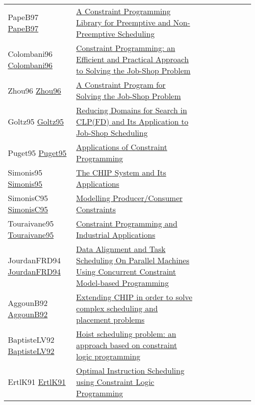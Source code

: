 {\begin{longtable}{p{3cm}p{7cm}lllllll}
PapeB97 \href{}{PapeB97} &  \href{}{A Constraint Programming Library for Preemptive and Non-Preemptive Scheduling} &  &  &  &  &  &  & \\
Colombani96 \href{https://doi.org/10.1007/3-540-61551-2\_72}{Colombani96} &  \href{papers/Colombani96.pdf}{Constraint Programming: an Efficient and Practical Approach to Solving the Job-Shop Problem} &  &  &  &  &  &  & \\
Zhou96 \href{https://doi.org/10.1007/3-540-61551-2\_97}{Zhou96} &  \href{papers/Zhou96.pdf}{A Constraint Program for Solving the Job-Shop Problem} &  &  &  &  &  &  & \\
Goltz95 \href{https://doi.org/10.1007/3-540-60299-2\_33}{Goltz95} &  \href{papers/Goltz95.pdf}{Reducing Domains for Search in {CLP(FD)} and Its Application to Job-Shop Scheduling} &  &  &  &  &  &  & \\
Puget95 \href{https://doi.org/10.1007/3-540-60299-2\_43}{Puget95} &  \href{papers/Puget95.pdf}{Applications of Constraint Programming} &  &  &  &  &  &  & \\
Simonis95 \href{https://doi.org/10.1007/3-540-60299-2\_42}{Simonis95} &  \href{papers/Simonis95.pdf}{The {CHIP} System and Its Applications} &  &  &  &  &  &  & \\
SimonisC95 \href{https://doi.org/10.1007/3-540-60299-2\_27}{SimonisC95} &  \href{papers/SimonisC95.pdf}{Modelling Producer/Consumer Constraints} &  &  &  &  &  &  & \\
Touraivane95 \href{https://doi.org/10.1007/3-540-60299-2\_41}{Touraivane95} &  \href{papers/Touraivane95.pdf}{Constraint Programming and Industrial Applications} &  &  &  &  &  &  & \\
JourdanFRD94 \href{}{JourdanFRD94} &  \href{}{Data Alignment and Task Scheduling On Parallel Machines Using Concurrent Constraint Model-based Programming} &  &  &  &  &  &  & \\
AggounB92 \href{}{AggounB92} &  \href{}{Extending {CHIP} in order to solve complex scheduling and placement problems} &  &  &  &  &  &  & \\
BaptisteLV92 \href{https://doi.org/10.1109/ROBOT.1992.220195}{BaptisteLV92} &  \href{papers/BaptisteLV92.pdf}{Hoist scheduling problem: an approach based on constraint logic programming} &  &  &  &  &  &  & \\
ErtlK91 \href{https://doi.org/10.1007/3-540-54444-5\_89}{ErtlK91} &  \href{papers/ErtlK91.pdf}{Optimal Instruction Scheduling using Constraint Logic Programming} &  &  &  &  &  &  & \\
\end{longtable}
}


